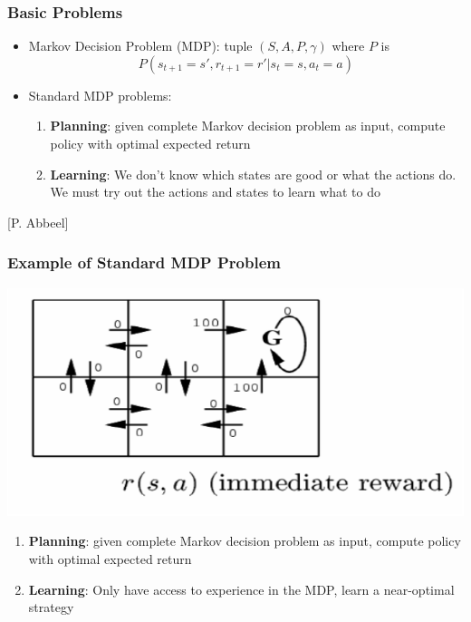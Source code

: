 \documentclass[handout]{beamer}
\renewcommand{\high}{\textbf}
\begin{document}
\begin{frame}\frametitle{Basic Problems}\small
\begin{itemize}
\item Markov Decision Problem (MDP): tuple $(S,A,P,\gamma)$ where $P$ is
\[
P(s_{t+1}=s', r_{t+1}=r' | s_t = s, a_t = a)
\]
\item Standard MDP problems:
\begin{enumerate}
\item  \high{Planning}: given complete Markov decision problem as input, compute policy with optimal expected return\\[1mm]
\item \high{Learning}: We don't know which states are good or what the actions do. We must try out the actions and states to learn what to do
\end{enumerate}
\end{itemize}
\vspace{28mm}

\scriptsize [P. Abbeel]
\end{frame}

\begin{frame}\frametitle{Example of Standard MDP Problem}\small
\begin{center}
\includegraphics[width=0.54\linewidth]{Figures/tic_tac_rl} 
\end{center}
\begin{enumerate}
\item  \high{Planning}: given complete Markov decision problem as input, compute policy with optimal expected return
\item \high{Learning}: Only have access to experience in the MDP, learn a near-optimal strategy
\end{enumerate}
\end{frame}
\end{document}
